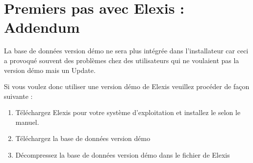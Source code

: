 \documentclass[a4paper]{scrartcl}
\begin{document}
\section{Premiers pas avec Elexis : Addendum}

La base de données version démo ne sera plus intégrée dans l'installateur car ceci a provoqué souvent des problèmes chez des utilisateurs qui ne voulaient pas la version démo mais un Update. 

Si vous voulez donc utiliser une version démo de Elexis veuillez procéder de façon suivante :

\begin{enumerate}
  \item Téléchargez Elexis pour votre système d'exploitation et installez le selon le manuel. 
  \item Téléchargez la base de données version démo
  \item Décompressez la base de données version démo dans le fichier de Elexis 
\end{enumerate}
\end{document}
